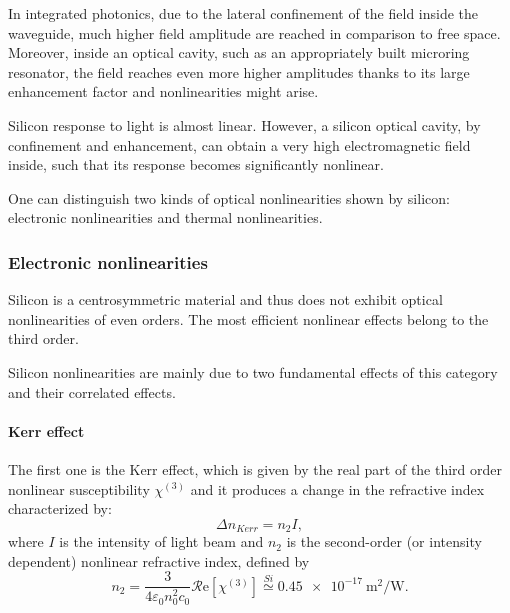 In integrated photonics, due to the lateral confinement of the field inside the waveguide, much higher field amplitude are reached in comparison to free space.
Moreover, inside an optical cavity, such as an appropriately built microring resonator, the field reaches even more higher amplitudes thanks to its large enhancement factor and nonlinearities might arise.

Silicon response to light is almost linear.
However, a silicon optical cavity, by confinement and enhancement, can obtain a very high electromagnetic field inside, such that its response becomes significantly nonlinear.

One can distinguish two kinds of optical nonlinearities shown by silicon: electronic nonlinearities and thermal nonlinearities.


\subsubsection{Electronic nonlinearities}
\label{sssec:Electronic_nonlinearities}
Silicon is a centrosymmetric material and thus does not exhibit optical nonlinearities of even orders.
The most efficient nonlinear effects belong to the third order.

Silicon nonlinearities are mainly due to two fundamental effects of this category and their correlated effects.
\paragraph{Kerr effect}
The first one is the Kerr effect, which is given by the real part of the third order nonlinear susceptibility $\chi^{(3)}$ and it produces a change in the refractive index characterized by:
\begin{equation}
	\Delta n_{Kerr} = n_2 I,
\end{equation}
where $I$ is the intensity of light beam and $n_2$ is the second-order (or intensity dependent) nonlinear refractive index, defined by
\begin{equation}
	n_2 = \dfrac{3}{4\varepsilon_0 n_0^2 c_0} \mathcal{R}\mathrm{e} \left[ \chi^{(3)} \right]
	\overset{Si}{\simeq} \SI{0.45e-17}{\square\m\per\W}.
\end{equation}

